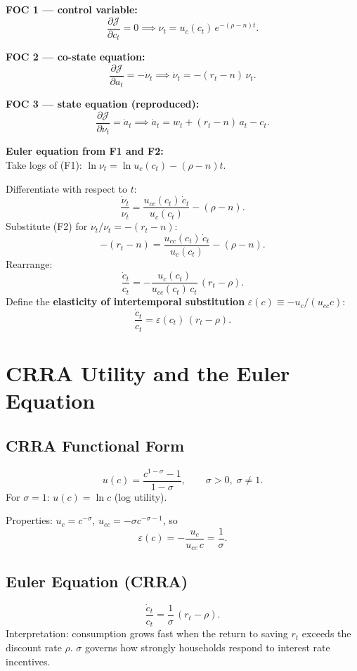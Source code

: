 \documentclass[a4paper,11pt]{article}
\begin{document}
\begin{derivationbox}[title={Deriving the Euler Equation from FOCs}]
\textbf{FOC 1 --- control variable:}
\[
  \frac{\partial \mathcal{J}}{\partial c_t} = 0
  \implies \nu_t = u_c(c_t)\, e^{-(\rho - n)t}. \tag{F1}
\]

\textbf{FOC 2 --- co-state equation:}
\[
  \frac{\partial \mathcal{J}}{\partial a_t} = -\dot{\nu}_t
  \implies \dot{\nu}_t = -(r_t - n)\,\nu_t. \tag{F2}
\]

\textbf{FOC 3 --- state equation (reproduced):}
\[
  \frac{\partial \mathcal{J}}{\partial \nu_t} = \dot{a}_t
  \implies \dot{a}_t = w_t + (r_t - n)\,a_t - c_t. \tag{F3}
\]

\textbf{Euler equation from F1 and F2:}\\[4pt]
Take logs of (F1): $\ln \nu_t = \ln u_c(c_t) - (\rho - n)t$.

Differentiate with respect to $t$:
\[
  \frac{\dot{\nu}_t}{\nu_t} = \frac{u_{cc}(c_t)\, \dot{c}_t}{u_c(c_t)} - (\rho - n).
\]
Substitute (F2) for $\dot{\nu}_t/\nu_t = -(r_t - n)$:
\[
  -(r_t - n) = \frac{u_{cc}(c_t)\, \dot{c}_t}{u_c(c_t)} - (\rho - n).
\]
Rearrange:
\[
  \frac{\dot{c}_t}{c_t}
  = -\frac{u_c(c_t)}{u_{cc}(c_t)\, c_t}\,(r_t - \rho).
\]
Define the \textbf{elasticity of intertemporal substitution} $\varepsilon(c) \equiv -u_c/(u_{cc} c)$:
\[
  \boxed{\frac{\dot{c}_t}{c_t} = \varepsilon(c_t)\,(r_t - \rho).}
\]
\end{derivationbox}

\section{CRRA Utility and the Euler Equation}

\subsection*{CRRA Functional Form}
\[
  u(c) = \frac{c^{1-\sigma} - 1}{1 - \sigma}, \qquad \sigma > 0, \; \sigma \neq 1.
\]
For $\sigma = 1$: $u(c) = \ln c$ (log utility).

Properties: $u_c = c^{-\sigma}$, $u_{cc} = -\sigma c^{-\sigma - 1}$, so
\[
  \varepsilon(c) = -\frac{u_c}{u_{cc}\, c} = \frac{1}{\sigma}.
\]

\subsection*{Euler Equation (CRRA)}
\begin{resultbox}
\[
  \frac{\dot{c}_t}{c_t} = \frac{1}{\sigma}\,(r_t - \rho).
\]
Interpretation: consumption grows fast when the return to saving $r_t$ exceeds the discount rate $\rho$. $\sigma$ governs how strongly households respond to interest rate incentives.
\end{resultbox}
\end{document}
